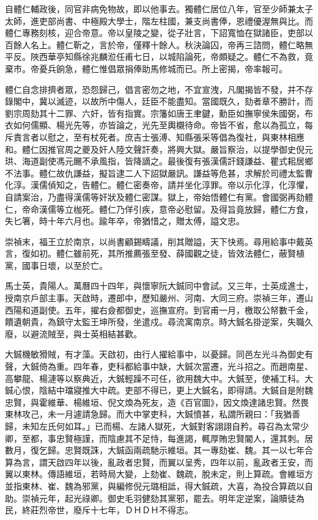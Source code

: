 \begin{pinyinscope}
自體仁輔政後，同官非病免物故，即以他事去。獨體仁居位八年，官至少師兼太子太師，進吏部尚書、中極殿大學士，階左柱國，兼支尚書俸，恩禮優渥無與比。而體仁專務刻核，迎合帝意。帝以皇陵之變，從子壯言，下詔寬恤在獄諸臣，吏部以百餘人名上。體仁靳之，言於帝，僅釋十餘人。秋決論囚，帝再三諮問，體仁略無平反。陜西華亭知縣徐兆麟涖任甫七日，以城陷論死，帝頗疑之。體仁不為救，竟棄市。帝憂兵餉急，體仁惟倡眾捐俸助馬修城而已。所上密揭，帝率報可。

體仁自念排擠者眾，恐怨歸己，倡言密勿之地，不宜宣洩，凡閣揭皆不發，并不存錄閣中，冀以滅迹，以故所中傷人，廷臣不能盡知。當國既久，劾者章不勝計，而劉宗周劾其十二罪、六奸，皆有指實。宗籓如唐王聿鍵，勳臣如撫寧侯朱國弼，布衣如何儒顯、楊光先等，亦皆論之，光先至輿櫬待命。帝皆不省，愈以為孤立，每斥責言者以慰之，至有杖死者。庶吉士張溥、知縣張采等倡為復社，與東林相應和。體仁因推官周之夔及奸人陸文聲訐奏，將興大獄。嚴旨察治，以提學御史倪元珙、海道副使馮元颺不承風指，皆降謫之。最後復有張漢儒訐錢謙益、瞿式耜居鄉不法事。體仁故仇謙益，擬旨逮二人下詔獄嚴訊。謙益等危甚，求解於司禮太監曹化淳。漢儒偵知之，告體仁。體仁密奏帝，請并坐化淳罪。帝以示化淳，化淳懼，自請案治，乃盡得漢儒等奸狀及體仁密謀。獄上，帝始悟體仁有黨。會國弼再劾體仁，帝命漢儒等立枷死。體仁乃佯引疾，意帝必慰留。及得旨竟放歸，體仁方食，失匕箸，時十年六月也。踰年卒，帝猶惜之，贈太傅，謚文忠。

崇禎末，福王立於南京，以尚書顧錫疇議，削其贈謚，天下快焉。尋用給事中戴英言，復如初。體仁雖前死，其所推薦張至發、薛國觀之徒，皆效法體仁，蔽賢植黨，國事日壞，以至於亡。

馬士英，貴陽人。萬曆四十四年，與懷寧阮大鋮同中會試。又三年，士英成進士，授南京戶部主事。天啟時，遷郎中，歷知嚴州、河南、大同三府。崇禎三年，遷山西陽和道副使。五年，擢右僉都御史，巡撫宣府。到官甫一月，檄取公帑數千金，饋遺朝貴，為鎮守太監王坤所發，坐遣戍。尋流寓南京。時大鋮名掛逆案，失職久廢，以避流賊至，與士英相結甚歡。

大鋮機敏猾賊，有才藻。天啟初，由行人擢給事中，以憂歸。同邑左光斗為御史有聲，大鋮倚為重。四年春，吏科都給事中缺，大鋮次當遷，光斗招之。而趙南星、高攀龍、楊漣等以察典近，大鋮輕躁不可任，欲用魏大中。大鋮至，使補工科。大鋮心恨，陰結中璫寢推大中疏。吏部不得已，更上大鋮名，即得請。大鋮自是附魏忠賢，與霍維華、楊維垣、倪文煥為死友，造《百官圖》，因文煥達諸忠賢。然畏東林攻己，未一月遽請急歸。而大中掌吏科，大鋮憤甚，私謂所親曰：「我猶善歸，未知左氏何如耳。」已而楊、左諸人獄死，大鋮對客詡詡自矜。尋召為太常少卿，至都，事忠賢極謹，而陰慮其不足恃，每進謁，輒厚賄忠賢閽人，還其刺。居數月，復乞歸。忠賢既誅，大鋮函兩疏馳示維垣。其一專劾崔、魏。其一以七年合算為言，謂天啟四年以後，亂政者忠賢，而翼以呈秀，四年以前，亂政者王安，而翼以東林。傳語維垣，若時局大變，上劾崔、魏疏，脫未定，則上算疏。會維垣方並指東林、崔、魏為邪黨，與編修倪元璐相詆，得大鋮疏，大喜，為投合算疏以自助。崇禎元年，起光祿卿。御史毛羽健劾其黨邪，罷去。明年定逆案，論贖徒為民，終莊烈帝世，廢斥十七年，ＤＨＤＨ不得志。


\end{pinyinscope}
